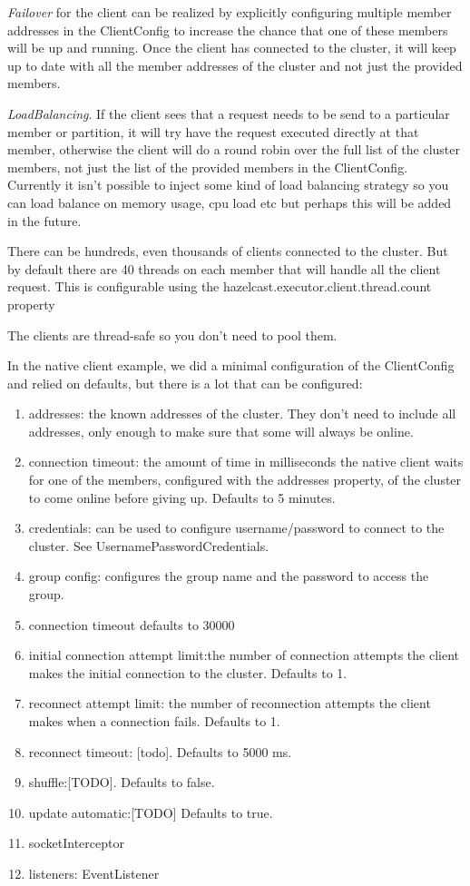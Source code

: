 \emph{Failover} for the client can be realized by explicitly configuring multiple member addresses in the ClientConfig to increase the chance that one of these members will be up and running. Once the client has connected to the cluster, it will keep up to date with all the member addresses of the cluster and not just the provided members.

\emph{LoadBalancing}. If the client sees that a request needs to be send to a particular member or partition, it will try have the request executed directly at that member, otherwise the client will do a round robin over the full list of the cluster members, not just the list of the provided members in the ClientConfig.  Currently it isn't possible to inject some kind of load balancing strategy so you can load balance on memory usage, cpu load etc but perhaps this will be added in the future. 

There can be hundreds, even thousands of clients connected to the cluster. But by default there are 40 threads on each member that will handle all the client request. This is configurable using the hazelcast.executor.client.thread.count property

The clients are thread-safe so you don't need to pool them.

In the native client example, we did a minimal configuration of the ClientConfig and relied on defaults, but there is a lot that can be configured:
\begin{enumerate}
\item addresses: the known addresses of the cluster. They don't need to include all addresses, only enough to make sure that some will always be online.
\item connection timeout: the amount of time in milliseconds the native client waits for one of the members, configured with the addresses property, of the cluster to come online before giving up. Defaults to 5 minutes.
\item credentials: can be used to configure username/password to connect to the cluster. See UsernamePasswordCredentials.
\item group config: configures the group name and the password to access the group.
\item connection timeout defaults to 30000
\item initial connection attempt limit:the  number of connection attempts the client makes the initial connection to the cluster. Defaults to 1.
\item reconnect attempt limit: the number of reconnection attempts the client makes when a connection fails. Defaults to 1.
\item reconnect timeout: [todo]. Defaults to 5000 ms.
\item shuffle:[TODO]. Defaults to false.
\item update automatic:[TODO] Defaults to true.
\item socketInterceptor
\item listeners: EventListener
\end{enumerate}

